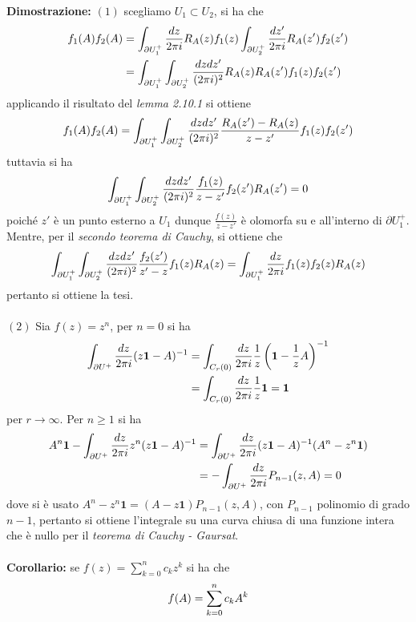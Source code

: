\documentclass{article}
\begin{document}
\textbf{Dimostrazione:} $(1)$ scegliamo $U_1 \subset U_2$, si ha che
\begin{align}
    f_1(A)f_2(A) &= \int_{\partial U^+_1}\frac{dz}{2\pi i}R_A(z)f_1(z)\int_{\partial U^+_2}\frac{dz'}{2\pi i}R_A(z')f_2(z') \notag \\
    &= \int_{\partial U^+_1}\int_{\partial U^+_2}\frac{dzdz'}{(2\pi i)^2}R_A(z)R_A(z')f_1(z)f_2(z') \notag
\end{align}
applicando il risultato del \textit{lemma 2.10.1} si ottiene
\begin{align}
    f_1(A)f_2(A) = \int_{\partial U^+_1}\int_{\partial U^+_2}\frac{dzdz'}{(2\pi i)^2}\frac{R_A(z') - R_A(z)}{z - z'}f_1(z)f_2(z') \notag
\end{align}
tuttavia si ha
\begin{gather}
    \int_{\partial U^+_1}\int_{\partial U^+_2}\frac{dzdz'}{(2\pi i)^2}\frac{f_1(z)}{z - z'}f_2(z')R_A(z') = 0 \notag
\end{gather}
poiché $z'$ è un punto esterno a $U_1$ dunque $\frac{f(z)}{z - z'}$ è olomorfa su e all'interno di $\partial U^+_1$. Mentre, per il \textit{secondo teorema di Cauchy}, si ottiene che
\begin{gather}
    \int_{\partial U^+_1}\int_{\partial U^+_2}\frac{dzdz'}{(2\pi i)^2}\frac{f_2(z')}{z' - z}f_1(z)R_A(z) = \int_{\partial U^+_1}\frac{dz}{2\pi i}f_1(z)f_2(z)R_A(z) \notag
\end{gather}
pertanto si ottiene la tesi. \\ \\
$(2)$ Sia $f(z) = z^n$, per $n = 0$ si ha
\begin{align}
    \int_{\partial U^+}\frac{dz}{2\pi i}(z\mathbf{1} - A)^{-1} &= \int_{C_r(0)}\frac{dz}{2\pi i}\frac{1}{z}\left(\mathbf{1} - \frac{1}{z}A\right)^{-1} \notag \\
    &= \int_{C_r(0)}\frac{dz}{2\pi i}\frac{1}{z}\mathbf{1} = \mathbf{1} \notag
\end{align}
per $r \rightarrow \infty$. Per $n \geq 1$ si ha
\begin{align}
    A^n\mathbf{1} - \int_{\partial U^+}\frac{dz}{2\pi i}z^n(z\mathbf{1} - A)^{-1} &= \int_{\partial U^+}\frac{dz}{2\pi i}(z\mathbf{1} - A)^{-1}(A^n - z^n\mathbf{1}) \notag \\
    &= -\int_{\partial U^+}\frac{dz}{2\pi i}P_{n - 1}(z, A) = 0 \notag
\end{align}
dove si è usato $A^n - z^n\mathbf{1} = (A - z\mathbf{1})P_{n - 1}(z, A)$, con $P_{n - 1}$ polinomio di grado $n - 1$, pertanto si ottiene l'integrale su una curva chiusa di una funzione intera che è nullo per il \textit{teorema di Cauchy - Gaursat}. \\ \\
\textbf{Corollario:} se $f(z) = \sum_{k = 0}^n c_kz^k$ si ha che
\begin{gather}
    f(A) = \sum_{k = 0}^nc_kA^k \notag
\end{gather}
\end{document}
